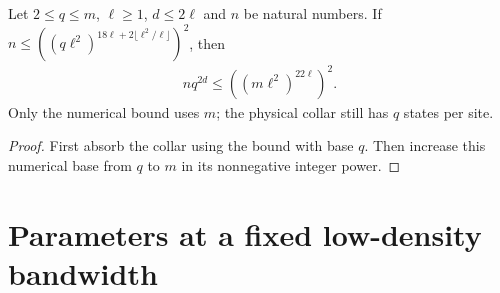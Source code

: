 \begin{lemma}
    \label{thm:collar_larger_count_base}
    \leanok
    Let $2\le q\le m$, $\ell\ge1$, $d\le2\ell$ and $n$ be natural numbers.
    If $n\le((q\ell^2)^{18\ell+2\lfloor\ell^2/\ell\rfloor})^2$, then
    \begin{align}
        nq^{2d}\le((m\ell^2)^{22\ell})^2.
    \end{align}
    Only the numerical bound uses $m$; the physical collar still has $q$
    states per site.
\end{lemma}
\begin{proof}
    \leanok
    First absorb the collar using the bound with base $q$.
    Then increase this numerical base from $q$ to $m$ in its nonnegative
    integer power.
\end{proof}

\section{Parameters at a fixed low-density bandwidth}

